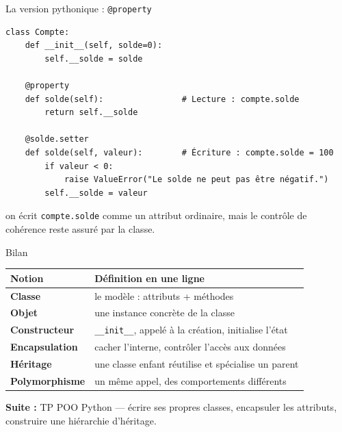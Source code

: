 \documentclass[11pt,aspectratio=169]{beamer}
\newcommand{\py}[1]{\texttt{#1}}
\begin{document}
\begin{frame}[fragile,shrink=5]{La version pythonique : \py{@property}}
\begin{lstlisting}
class Compte:
    def __init__(self, solde=0):
        self.__solde = solde

    @property
    def solde(self):                # Lecture : compte.solde
        return self.__solde

    @solde.setter
    def solde(self, valeur):        # Écriture : compte.solde = 100
        if valeur < 0:
            raise ValueError("Le solde ne peut pas être négatif.")
        self.__solde = valeur
\end{lstlisting}
  \vspace{-2mm}
  \begin{methode}[Avantage]
    on écrit \py{compte.solde} comme un attribut ordinaire, mais le contrôle de
    cohérence reste assuré par la classe.
  \end{methode}
\end{frame}

\begin{frame}{Bilan}
  \begin{center}
  \renewcommand{\arraystretch}{1.25}\small
  \begin{tabular}{@{}>{\bfseries}l l@{}}
    \toprule
    Notion & Définition en une ligne \\
    \midrule
    Classe          & le modèle : attributs + méthodes \\
    Objet           & une instance concrète de la classe \\
    Constructeur    & \py{\_\_init\_\_}, appelé à la création, initialise l'état \\
    Encapsulation   & cacher l'interne, contrôler l'accès aux données \\
    Héritage        & une classe enfant réutilise et spécialise un parent \\
    Polymorphisme   & un même appel, des comportements différents \\
    \bottomrule
  \end{tabular}
  \end{center}
  \vspace{-1mm}
  \begin{exam}
    \textbf{Suite :} TP POO Python --- écrire ses propres classes, encapsuler
    les attributs, construire une hiérarchie d'héritage.
  \end{exam}
\end{frame}
\end{document}
